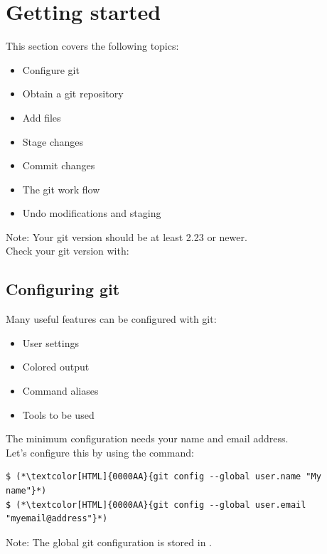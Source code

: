 \section{Getting started}
\begin{frame}[fragile]
  \slidetitle

  This section covers the following topics:
  \begin{itemize}
    \item Configure git
    \item Obtain a git repository
    \item Add files
    \item Stage changes
    \item Commit changes
    \item The git work flow
    \item Undo modifications and staging
  \end{itemize}

  \vspace{2em}
	Note: Your git version should be at least 2.23 or newer. \\
	Check your git version with: 
\end{frame}

\subsection{Configuring git}
\begin{frame}[fragile]
  \subslidetitle
  Many useful features can be configured with git:
  \begin{itemize}
    \item User settings
    \item Colored output
    \item Command aliases
    \item Tools to be used
  \end{itemize}

  \vspace{1em}
  The minimum configuration needs your name and email address.\\
  Let's configure this by using the  command:
  \begin{lstlisting}
$ (*\textcolor[HTML]{0000AA}{git config --global user.name "My name"}*)
$ (*\textcolor[HTML]{0000AA}{git config --global user.email "myemail@address"}*)
\end{lstlisting}

  \vspace{1em}
  Note: The global git configuration is stored in .

\end{frame}

